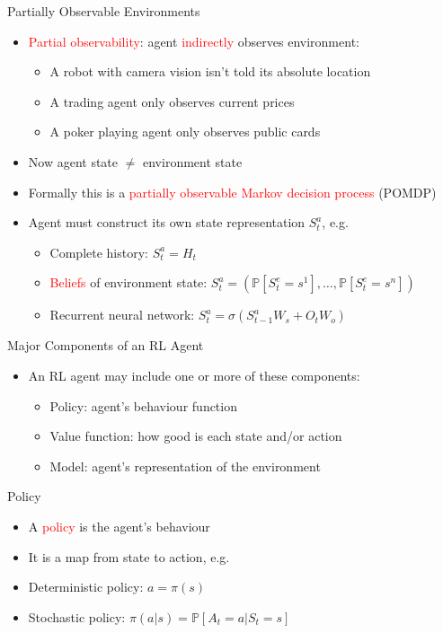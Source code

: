 \begin{frame}{Partially Observable Environments}
\begin{itemize}
  \item \textcolor{red}{Partial observability}: agent \textcolor{red}{indirectly} observes environment:
  \begin{itemize}
    \item A robot with camera vision isn't told its absolute location
    \item A trading agent only observes current prices
    \item A poker playing agent only observes public cards
  \end{itemize}
  \item Now agent state $\neq$ environment state
  \item Formally this is a \textcolor{red}{partially observable Markov decision process} (POMDP)
  \item Agent must construct its own state representation $S^a_t$, e.g.
  \begin{itemize}
    \item Complete history: $S^a_t = H_t$
    \item \textcolor{red}{Beliefs} of environment state: $S^a_t = (\mathbb{P}[S^e_t = s^1], \ldots, \mathbb{P}[S^e_t = s^n])$
    \item Recurrent neural network: $S^a_t = \sigma(S^a_{t-1} W_s + O_t W_o)$
  \end{itemize}
\end{itemize}
\end{frame}

\begin{frame}{Major Components of an RL Agent}
\begin{itemize}
  \item An RL agent may include one or more of these components:
  \begin{itemize}
    \item Policy: agent's behaviour function
    \item Value function: how good is each state and/or action
    \item Model: agent's representation of the environment
  \end{itemize}
\end{itemize}
\end{frame}

\begin{frame}{Policy}
\begin{itemize}
  \item A \textcolor{red}{policy} is the agent's behaviour
  \item It is a map from state to action, e.g.
  \item Deterministic policy: $a = \pi(s)$
  \item Stochastic policy: $\pi(a|s) = \mathbb{P}[A_t = a | S_t = s]$
\end{itemize}
\end{frame}

